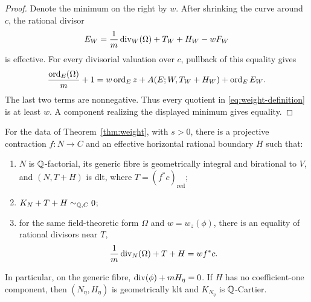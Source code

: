 \begin{proof}
Denote the minimum on the right by $w$.  After shrinking the curve
around $c$, the rational divisor
\begin{equation}\label{eq:weight-error}
 E_W=\frac1m\operatorname{div}_W(\Omega)+T_W+H_W-wF_W
\end{equation}
is effective.  For every divisorial valuation over $c$, pullback of
this equality gives
\begin{equation}\label{eq:weight-discrepancy}
 \frac{\operatorname{ord}_E(\Omega)}m+1
   =w\operatorname{ord}_E z+A(E;W,T_W+H_W)+\operatorname{ord}_E E_W.
\end{equation}
The last two terms are nonnegative.  Thus every quotient in
\eqref{eq:weight-definition} is at least $w$.  A component realizing
the displayed minimum gives equality.
\end{proof}

\begin{proposition}\label{prop:prepared}
For the data of Theorem~\ref{thm:weight}, with $s>0$, there is a
projective contraction $f:N\to C$ and an effective horizontal rational
boundary $H$ such that:
\begin{enumerate}
\item $N$ is $\mathbb Q$-factorial, its generic fibre is geometrically integral
and birational to $V$, and $(N,T+H)$ is dlt, where
$T=(f^*c)_{\mathrm{red}}$;
\item $K_N+T+H\sim_{\mathbb Q,C}0$;
\item for the same field-theoretic form $\Omega$ and
$w=w_z(\phi)$, there is an equality of rational divisors near $T$,
\begin{equation}\label{eq:prepared-equality}
                    \frac1m\operatorname{div}_N(\Omega)+T+H=w f^*c.
\end{equation}
\end{enumerate}
In particular, on the generic fibre,
$\operatorname{div}(\phi)+mH_\eta=0$.  If $H$ has no coefficient-one component,
then $(N_\eta,H_\eta)$ is geometrically klt and $K_{N_\eta}$ is
$\mathbb Q$-Cartier.
\end{proposition}

